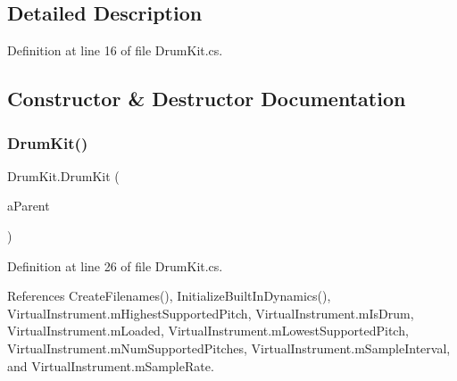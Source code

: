 \subsection{Detailed Description}


Definition at line 16 of file Drum\+Kit.\+cs.



\subsection{Constructor \& Destructor Documentation}
\mbox{\label{class_drum_kit_abade574e7f9d5684653c0b33524362a7}} 
\subsubsection{\texorpdfstring{Drum\+Kit()}{DrumKit()}}
{\footnotesize\ttfamily Drum\+Kit.\+Drum\+Kit (\begin{DoxyParamCaption}\item[{\hyperlink{class_virtual_instrument_manager}{Virtual\+Instrument\+Manager}}]{a\+Parent }\end{DoxyParamCaption})}



Definition at line 26 of file Drum\+Kit.\+cs.



References Create\+Filenames(), Initialize\+Built\+In\+Dynamics(), Virtual\+Instrument.\+m\+Highest\+Supported\+Pitch, Virtual\+Instrument.\+m\+Is\+Drum, Virtual\+Instrument.\+m\+Loaded, Virtual\+Instrument.\+m\+Lowest\+Supported\+Pitch, Virtual\+Instrument.\+m\+Num\+Supported\+Pitches, Virtual\+Instrument.\+m\+Sample\+Interval, and Virtual\+Instrument.\+m\+Sample\+Rate.


